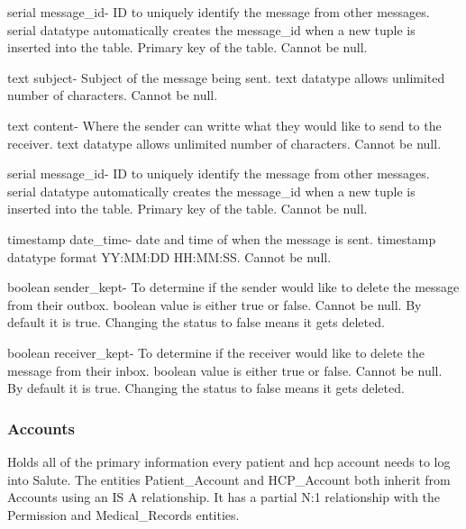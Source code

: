 \documentclass[12pt]{report}
\begin{document}
\begin{description}
\item serial message\_id- ID to uniquely identify the message from other messages. serial datatype automatically creates the message\_id when a new tuple is inserted into the table.  Primary key of the table.  Cannot be null.
\item text subject- Subject of the message being sent. text datatype allows unlimited number of characters.  Cannot be null.
\item text content- Where the sender can writte what they would like to send to the receiver.  text datatype allows unlimited number of characters.  Cannot be null.
\item serial message\_id- ID to uniquely identify the message from other messages. serial datatype automatically creates the message\_id when a new tuple is inserted into the table.  Primary key of the table.  Cannot be null.
\item timestamp date\_time- date and time of when the message is sent.  timestamp datatype format YY:MM:DD HH:MM:SS.  Cannot be null.
\item boolean sender\_kept- To determine if the sender would like to delete the message from their outbox.  boolean value is either true or false.  Cannot be null.  By default it is true.  Changing the status to false means it gets deleted.
\item boolean receiver\_kept- To determine if the receiver would like to delete the message from their inbox.  boolean value is either true or false.  Cannot be null.  By default it is true.  Changing the status to false means it gets deleted.
\end{description}

\subsubsection{Accounts}
Holds all of the primary information every patient and hcp account needs to log into Salute.  The entities Patient\_Account and HCP\_Account both inherit from Accounts using an IS A relationship.  It has a partial N:1 relationship with the Permission and Medical\_Records entities.
\end{document}
